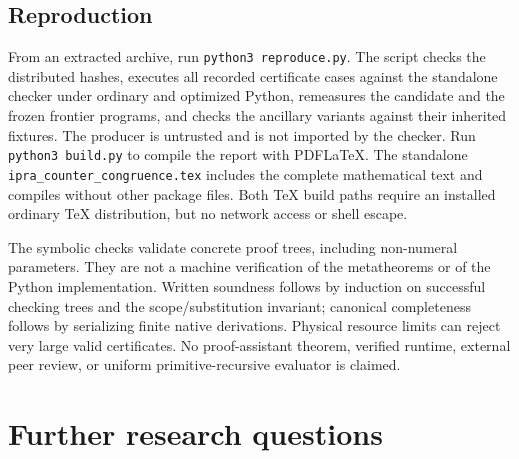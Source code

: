 \documentclass[11pt,letterpaper]{article}
\theoremstyle{definition}\newtheorem{definition}[theorem]{Definition}
\theoremstyle{remark}\newtheorem{remark}[theorem]{Remark}
\newcommand{\file}[1]{{\small\nolinkurl{#1}}}
\begin{document}
\subsection{Reproduction}

From an extracted archive, run \file{python3 reproduce.py}. The script
checks the distributed hashes, executes all recorded certificate cases
against the standalone checker under ordinary and optimized Python,
remeasures the candidate and the frozen frontier programs, and checks
the ancillary variants against their inherited fixtures.
The producer is untrusted and is not imported by the checker. Run
\file{python3 build.py} to compile the report with PDFLaTeX.
The standalone \file{ipra_counter_congruence.tex} includes the complete
mathematical text and compiles without other package files. Both TeX
build paths require an installed ordinary TeX distribution, but no
network access or shell escape.

The symbolic checks validate concrete proof trees, including non-numeral
parameters. They are not a machine verification of the metatheorems or
of the Python implementation. Written soundness follows by induction
on successful checking trees and the scope/substitution invariant;
canonical completeness follows by serializing finite native derivations.
Physical resource limits can reject very large valid certificates.
No proof-assistant theorem, verified runtime, external peer review,
or uniform primitive-recursive evaluator is claimed.

\section{Further research questions}
\label{sec:further}
\end{document}
